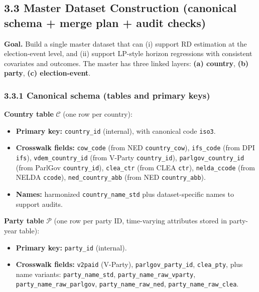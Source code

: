 \documentclass[11pt]{article}
\newcommand{\1}{\mathbf{1}}
\newcommand{\mc}{\mathcal}
\begin{document}
\subsection*{3.3 Master Dataset Construction (canonical schema + merge plan + audit checks)}
\textbf{Goal.} Build a single master dataset that can (i) support RD estimation at the election-event level, and (ii) support LP-style horizon regressions with consistent covariates and outcomes. The master has three linked layers: \textbf{(a) country}, \textbf{(b) party}, \textbf{(c) election-event}.

\subsubsection*{3.3.1 Canonical schema (tables and primary keys)}
\textbf{Country table} $\mc{C}$ (one row per country):
\begin{itemize}[leftmargin=1.2em]
\item \textbf{Primary key:} \texttt{country\_id} (internal), with canonical code \texttt{iso3}.
\item \textbf{Crosswalk fields:} \texttt{cow\_code} (from NED \texttt{country\_cow}), \texttt{ifs\_code} (from DPI \texttt{ifs}), \texttt{vdem\_country\_id} (from V-Party \texttt{country\_id}), \texttt{parlgov\_country\_id} (from ParlGov \texttt{country\_id}), \texttt{clea\_ctr} (from CLEA \texttt{ctr}), \texttt{nelda\_ccode} (from NELDA \texttt{ccode}), \texttt{ned\_country\_abb} (from NED \texttt{country\_abb}).
\item \textbf{Names:} harmonized \texttt{country\_name\_std} plus dataset-specific names to support audits.
\end{itemize}

\textbf{Party table} $\mc{P}$ (one row per party ID, time-varying attributes stored in party-year table):
\begin{itemize}[leftmargin=1.2em]
\item \textbf{Primary key:} \texttt{party\_id} (internal).
\item \textbf{Crosswalk fields:} \texttt{v2paid} (V-Party), \texttt{parlgov\_party\_id}, \texttt{clea\_pty}, plus name variants: \texttt{party\_name\_std}, \texttt{party\_name\_raw\_vparty}, \texttt{party\_name\_raw\_parlgov}, \texttt{party\_name\_raw\_ned}, \texttt{party\_name\_raw\_clea}.
\end{itemize}
\end{document}
